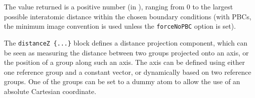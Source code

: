The value returned is a positive number (in \lengthunit), ranging from $0$
to the largest possible interatomic distance within the chosen
boundary conditions (with PBCs, the minimum image convention is used
unless the \texttt{forceNoPBC} option is set).



The \texttt{distanceZ~\{...\}} block defines a distance projection
component, which can be seen as measuring the distance between two
groups projected onto an axis, or the position of a group along such
an axis.  The axis can be defined using either one reference group and
a constant vector, or dynamically based on two reference groups.
One of the groups can be set to a dummy atom to allow the use of an absolute Cartesian coordinate.

